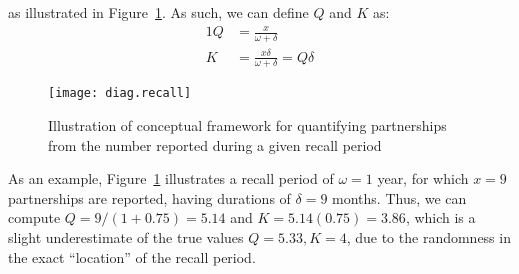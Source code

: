 as illustrated in Figure~\ref{fig:diag.recall}.
As such, we can define $Q$ and $K$ as:
\begin{alignat}{1}
  Q &= \frac{x}{\omega+\delta} \label{eq:C2Q.app}\\
  K &= \frac{x\delta}{\omega+\delta} = Q\delta \label{eq:C2K.app}
\end{alignat}
\begin{figure}
  \centering
  \texttt{[image: diag.recall]}
  \caption{Illustration of conceptual framework for quantifying partnerships
    from the number reported during a given recall period}
  \label{fig:diag.recall}
\end{figure}
\par
As an example, Figure~\ref{fig:diag.recall} illustrates
a recall period of $\omega = 1$ year,
for which $x = 9$ partnerships are reported,
having durations of $\delta = 9$ months.
Thus, we can compute $Q = 9/(1+0.75) = 5.14$ and $K = 5.14(0.75) = 3.86$,
which is a slight underestimate of the true values $Q = 5.33, K = 4$,
due to the randomness in the exact ``location'' of the recall period.

